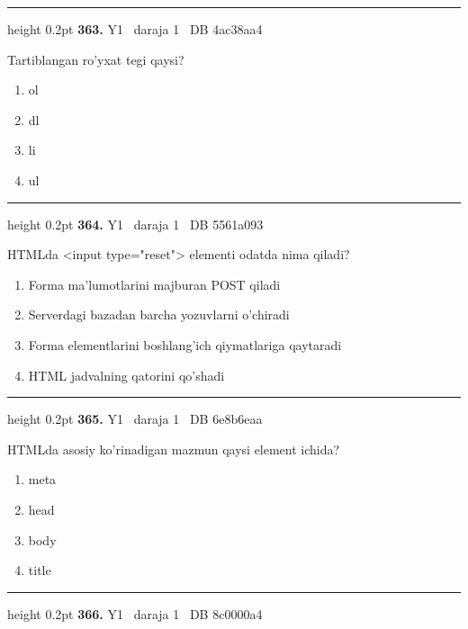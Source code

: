 \documentclass[10pt,a4paper,oneside]{article}
\begin{document}
\vspace{2mm}\hrule height 0.2pt \vspace{4mm}
\hypertarget{q363}{\textbf{\color{ink}363.}}  {\color{muted}\scriptsize Y1 \textbullet\ daraja 1 \textbullet\ DB 4ac38aa4}
\par
Tartiblangan ro'yxat tegi qaysi?
\begin{enumerate}[label=\Alph*),leftmargin=9mm]
\item ol
\item dl
\item li
\item ul
\end{enumerate}
\vspace{2mm}\hrule height 0.2pt \vspace{4mm}
\hypertarget{q364}{\textbf{\color{ink}364.}}  {\color{muted}\scriptsize Y1 \textbullet\ daraja 1 \textbullet\ DB 5561a093}
\par
HTMLda \textless{}input type="reset"\textgreater{} elementi odatda nima qiladi?
\begin{enumerate}[label=\Alph*),leftmargin=9mm]
\item Forma ma'lumotlarini majburan POST qiladi
\item Serverdagi bazadan barcha yozuvlarni o'chiradi
\item Forma elementlarini boshlang'ich qiymatlariga qaytaradi
\item HTML jadvalning qatorini qo'shadi
\end{enumerate}
\vspace{2mm}\hrule height 0.2pt \vspace{4mm}
\hypertarget{q365}{\textbf{\color{ink}365.}}  {\color{muted}\scriptsize Y1 \textbullet\ daraja 1 \textbullet\ DB 6e8b6eaa}
\par
HTMLda asosiy ko'rinadigan mazmun qaysi element ichida?
\begin{enumerate}[label=\Alph*),leftmargin=9mm]
\item meta
\item head
\item body
\item title
\end{enumerate}
\vspace{2mm}\hrule height 0.2pt \vspace{4mm}
\hypertarget{q366}{\textbf{\color{ink}366.}}  {\color{muted}\scriptsize Y1 \textbullet\ daraja 1 \textbullet\ DB 8c0000a4}
\end{document}
